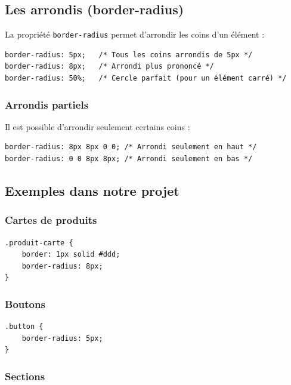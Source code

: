 \documentclass[12pt,a4paper]{article}
\begin{document}
\subsection{Les arrondis (border-radius)}

La propriété \texttt{border-radius} permet d'arrondir les coins d'un élément :

\begin{lstlisting}[style=CSS]
border-radius: 5px;   /* Tous les coins arrondis de 5px */
border-radius: 8px;   /* Arrondi plus prononcé */
border-radius: 50%;   /* Cercle parfait (pour un élément carré) */
\end{lstlisting}

\subsubsection{Arrondis partiels}

Il est possible d'arrondir seulement certains coins :

\begin{lstlisting}[style=CSS]
border-radius: 8px 8px 0 0; /* Arrondi seulement en haut */
border-radius: 0 0 8px 8px; /* Arrondi seulement en bas */
\end{lstlisting}

\subsection{Exemples dans notre projet}

\subsubsection{Cartes de produits}

\begin{lstlisting}[style=CSS]
.produit-carte {
    border: 1px solid #ddd;
    border-radius: 8px;
}
\end{lstlisting}

\subsubsection{Boutons}

\begin{lstlisting}[style=CSS]
.button {
    border-radius: 5px;
}
\end{lstlisting}

\subsubsection{Sections}
\end{document}
